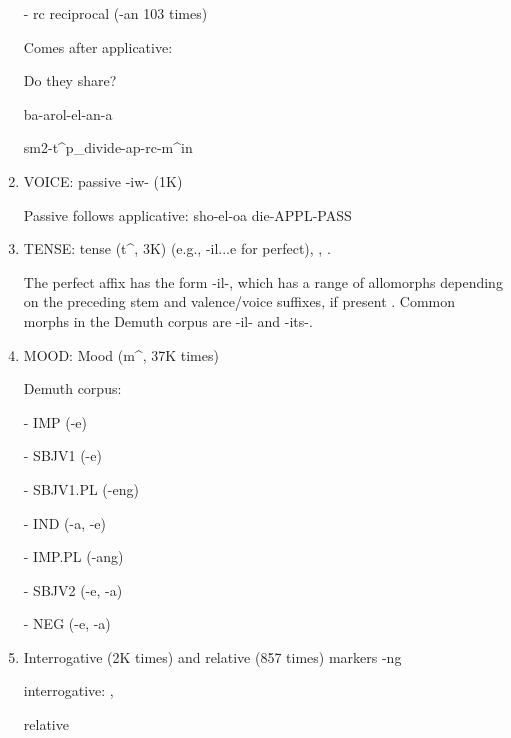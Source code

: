 \begin{enumerate}
    - rc reciprocal (-an 103 times)  \cite[]{doke1967textbook}
    
    Comes after applicative: 
    
    Do they share?
    
    ba-arol-el-an-a
    
    sm2-t\^{}p\_divide-ap-rc-m\^{}in
    
    \item VOICE: passive -iw- (1K)
    
    \cite[]{doke1967textbook} \cite[p. 114]{lombard1969handbook}
    
    Passive follows applicative: sho-el-oa die-APPL-PASS \cite[]{doke1967textbook}
    
    
    \item TENSE: tense (t\^{}, 3K) (e.g., -il...e for perfect), \cite[]{doke1967textbook}  \cite[p. 167]{guma1971outline}, \cite[p. 116]{lombard1969handbook}.
    
    
    The perfect affix has the form -il-, which has a range of allomorphs depending on the preceding stem and valence/voice suffixes, if present \cite[]{doke1967textbook}.
    Common morphs in the Demuth corpus are -il- and -its-.
    
     
    \item MOOD: Mood (m\^{}, 37K times)
    
    
    
    Demuth corpus:
    
    - IMP (-e)
    
    - SBJV1 (-e)
    
    - SBJV1.PL (-eng)
    
    - IND (-a, -e)
    
    - IMP.PL (-ang)
    
    - SBJV2 (-e, -a)
    
    - NEG  (-e, -a)
    
    
    \item Interrogative (2K times) and relative (857 times) markers -ng
    
    interrogative: \cite[p. 168]{guma1971handbook}, \cite[, 320]{doke1967textbook}
    
    relative \cite[, 793]{doke1967textbook}
    

\end{enumerate}

